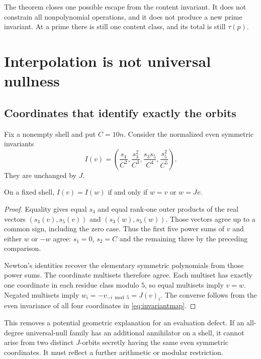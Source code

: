 The theorem closes one possible escape from the content invariant. It does not constrain all nonpolynomial operations, and it does not produce a new prime invariant. At a prime there is still one content class, and its total is still $\tau(p)$.

\chapter{Interpolation is not universal nullness}\label{ch:interpolation}
\section{Coordinates that identify exactly the orbits}
Fix a nonempty shell and put $C=10n$. Consider the normalized even symmetric invariants
\begin{equation}\label{eq:invariantmap}
I(v)=\left(\frac{s_4}{C^2},\frac{s_3^2}{C^3},
\frac{s_3s_5}{C^4},\frac{s_5^2}{C^5}\right).
\end{equation}
They are unchanged by $J$.

\begin{proposition}\label{prop:invariantseparation}
On a fixed shell, $I(v)=I(w)$ if and only if $w=v$ or $w=Jv$.
\end{proposition}
\begin{proof}
Equality gives equal $s_4$ and equal rank-one outer products of the real vectors $(s_3(v),s_5(v))$ and $(s_3(w),s_5(w))$. Those vectors agree up to a common sign, including the zero case. Thus the first five power sums of $v$ and either $w$ or $-w$ agree: $s_1=0$, $s_2=C$ and the remaining three by the preceding comparison.

Newton's identities recover the elementary symmetric polynomials from those power sums. The coordinate multisets therefore agree. Each multiset has exactly one coordinate in each residue class modulo $5$, so equal multisets imply $v=w$. Negated multisets imply $w_i=-v_{-i\bmod5}=J(v)_i$. The converse follows from the even invariance of all four coordinates in \eqref{eq:invariantmap}.
\end{proof}

This removes a potential geometric explanation for an evaluation defect. If an all-degree universal-null family has an additional annihilator on a shell, it cannot arise from two distinct $J$-orbits secretly having the same even symmetric coordinates. It must reflect a further arithmetic or modular restriction.

